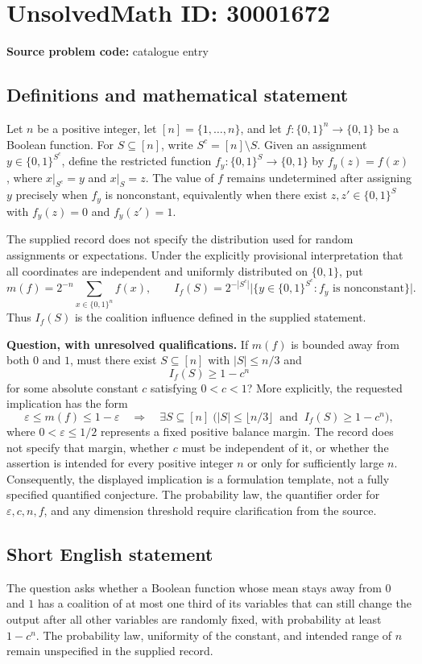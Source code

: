 \documentclass[11pt]{article}
\begin{document}
\section*{UnsolvedMath ID: 30001672}
\textbf{Source problem code:} catalogue entry
\subsection{Definitions and mathematical statement}
Let \(n\) be a positive integer, let \([n]=\{1,\ldots,n\}\), and let \(f:\{0,1\}^{n}\to\{0,1\}\) be a Boolean function. For \(S\subseteq[n]\), write \(S^{c}=[n]\setminus S\). Given an assignment \(y\in\{0,1\}^{S^{c}}\), define the restricted function \(f_y:\{0,1\}^{S}\to\{0,1\}\) by \(f_y(z)=f(x)\), where \(x|_{S^{c}}=y\) and \(x|_S=z\). The value of \(f\) remains undetermined after assigning \(y\) precisely when \(f_y\) is nonconstant, equivalently when there exist \(z,z'\in\{0,1\}^{S}\) with \(f_y(z)=0\) and \(f_y(z')=1\).

The supplied record does not specify the distribution used for random assignments or expectations. Under the explicitly provisional interpretation that all coordinates are independent and uniformly distributed on \(\{0,1\}\), put
\[
 m(f)=2^{-n}\sum_{x\in\{0,1\}^{n}}f(x),\qquad
 I_f(S)=2^{-|S^{c}|}\bigl|\{y\in\{0,1\}^{S^{c}}:f_y\text{ is nonconstant}\}\bigr|.
\]
Thus \(I_f(S)\) is the coalition influence defined in the supplied statement.

\textbf{Question, with unresolved qualifications.} If \(m(f)\) is bounded away from both \(0\) and \(1\), must there exist \(S\subseteq[n]\) with \(|S|\le n/3\) and
\[
 I_f(S)\ge 1-c^n
\]
for some absolute constant \(c\) satisfying \(0<c<1\)? More explicitly, the requested implication has the form
\[
 \varepsilon\le m(f)\le1-\varepsilon
 \quad\Longrightarrow\quad
 \exists S\subseteq[n]\;\bigl(|S|\le\lfloor n/3\rfloor\ \text{ and }\ I_f(S)\ge1-c^n\bigr),
\]
where \(0<\varepsilon\le1/2\) represents a fixed positive balance margin. The record does not specify that margin, whether \(c\) must be independent of it, or whether the assertion is intended for every positive integer \(n\) or only for sufficiently large \(n\). Consequently, the displayed implication is a formulation template, not a fully specified quantified conjecture. The probability law, the quantifier order for \(\varepsilon,c,n,f\), and any dimension threshold require clarification from the source.
\subsection{Short English statement}
The question asks whether a Boolean function whose mean stays away from \(0\) and \(1\) has a coalition of at most one third of its variables that can still change the output after all other variables are randomly fixed, with probability at least \(1-c^n\). The probability law, uniformity of the constant, and intended range of \(n\) remain unspecified in the supplied record.
\end{document}
